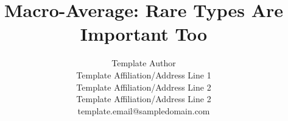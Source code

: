 



\title{Macro-Average: Rare Types Are Important Too}

\author{
 Template Author \\
 Template Affiliation/Address Line 1 \\
 Template Affiliation/Address Line 2 \\
 Template Affiliation/Address Line 2 \\
  {\sf template.email@sampledomain.com} \\
}


\date{}


\maketitle
\begin{abstract}
  
\end{abstract}







%




\clearpage
\appendix






